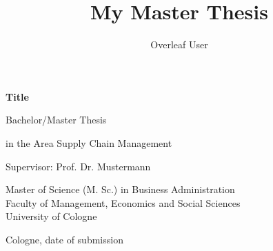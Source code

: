 \documentclass[a4paper,12pt, titlepage]{article}
\title{My Master Thesis}
\author{Overleaf User}
\date{ }
\begin{document}
\begin{titlepage}

   \begin{center}

       \vspace*{1cm}
 
 
 
       \vspace{1.5cm}
 
       \textbf{\large{Title}}
			
			 \vspace{1.5cm}
 
      		 Bachelor/Master Thesis
			
			 \vspace{1.5cm}
 
       in the Area Supply Chain Management
			
			 \vspace{1.5cm}
 
       Supervisor: Prof. Dr. Mustermann
			
			 \vspace{1.5cm}
 
      Master of Science (M. Sc.) in Business Administration \\ 
			\vspace{0.5cm} 
     Faculty of Management, Economics and Social Sciences \\
			\vspace{0.5cm} 
       University of Cologne
			\vspace{0.5cm} 
      
					
			\vspace{1.5cm}
 
       Cologne, date of submission
 

   \end{center}
\end{titlepage}

\renewcommand*\contentsname{Table of Contents}
\tableofcontents{}	\setcounter{page}{2} 
\newpage{}
\end{document}
